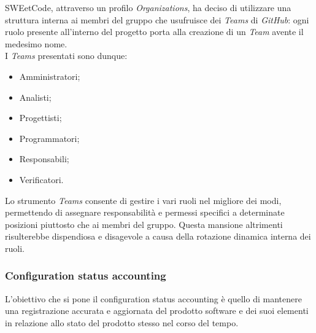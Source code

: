 \documentclass[10pt, a4paper]{article}
\begin{document}
SWEetCode, attraverso un profilo \textit{Organizations}, ha deciso di utilizzare una struttura interna ai membri del gruppo che usufruisce dei \textit{Teams} di 
\textit{GitHub}: ogni ruolo presente all'interno del progetto porta alla creazione di un \textit{Team} avente il medesimo nome.\\
I \textit{Teams} presentati sono dunque:
\begin{itemize}
    \item Amministratori;
    \item Analisti;
    \item Progettisti;
    \item Programmatori;
    \item Responsabili;
    \item Verificatori.
\end{itemize}
Lo strumento \textit{Teams} consente di gestire i vari ruoli nel migliore dei modi, permettendo di assegnare responsabilità e permessi specifici a determinate posizioni 
piuttosto che ai membri del gruppo. Questa mansione altrimenti risulterebbe dispendiosa e disagevole a causa della rotazione dinamica interna dei ruoli. 

\subsubsection{Configuration status accounting}
L'obiettivo che si pone il configuration status accounting è quello di mantenere una registrazione accurata e aggiornata del prodotto software e dei suoi elementi in
relazione allo stato del prodotto stesso nel corso del tempo.
\end{document}
